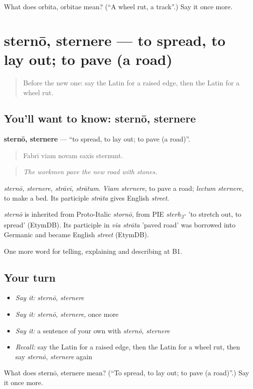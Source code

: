 \begin{tcolorbox}[breakable,colback=teal!4,colframe=teal!35!black,title={Before you move on}]
What does orbita, orbitae mean? (\textquotedblleft{}A wheel rut, a track\textquotedblright{}.) Say it once more.
\end{tcolorbox}
\section[sternō, sternere]{sternō, sternere — to spread, to lay out; to pave (a road)}

\label{lesson:LA-C425-sterno}



\begin{quote}
Before the new one: say the Latin for a raised edge, then the Latin for a wheel rut.
\end{quote}

\subsection*{You'll want to know: sternō, sternere}
\textbf{sternō, sternere} — \textquotedblleft{}to spread, to lay out; to pave (a road)\textquotedblright{}.

\begin{quote}
Fabrī viam novam saxīs sternunt.
\end{quote}

\begin{quote}
\emph{The workmen pave the new road with stones.}
\end{quote}

\emph{sternō, sternere, strāvī, strātum}. \emph{Viam sternere}, to pave a road; \emph{lectum sternere}, to make a bed. Its participle \emph{strāta} gives English \emph{street}.

\begin{cousinweb}
\emph{sternō} is inherited from Proto-Italic \emph{stornō}, from PIE \emph{sterh\textsubscript{3}-} 'to stretch out, to spread' (EtymDB). Its participle in \emph{via strāta} 'paved road' was borrowed into Germanic and became English \emph{street} (EtymDB).
\end{cousinweb}

\begin{grammarlens}[title={What you've built}]
One more word for telling, explaining and describing at B1.
\end{grammarlens}

\subsection*{Your turn}
\begin{itemize}
\raggedright
  \item \emph{Say it:} \emph{sternō, sternere}
  \item \emph{Say it:} \emph{sternō, sternere}, once more
  \item \emph{Say it:} a sentence of your own with \emph{sternō, sternere}
  \item \emph{Recall:} say the Latin for a raised edge, then the Latin for a wheel rut, then say \emph{sternō, sternere} again
\end{itemize}

\begin{tcolorbox}[breakable,colback=teal!4,colframe=teal!35!black,title={Before you move on}]
What does sternō, sternere mean? (\textquotedblleft{}To spread, to lay out; to pave (a road)\textquotedblright{}.) Say it once more.
\end{tcolorbox}
